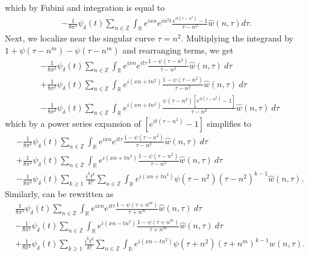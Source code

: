 \documentclass[12pt,reqno]{amsart}
\numberwithin{equation}{section}  %
\renewcommand{\cref}{\Cref}
\newcommand{\rr}{\mathbb{R}}
\newcommand{\zz}{\mathbb{Z}}
\newcommand{\wh}{\widehat}
\begin{document}
%
%
which by Fubini and integration is equal to
%
%
\begin{equation*}
\begin{split}
  -\frac{1}{8 \pi^{2}}  \psi_{\delta}(t) \sum_{n \in \zz} \int_{\rr} e^{ixn}
  e^{in^{2}t} \frac{e^{it(\tau - n^{2})} -1}{\tau - n^{2}}\wh{w}(n, \tau) d \tau.
\end{split}
\end{equation*}
%
Next, we localize near the singular curve $\tau =  n^2$.  Multiplying the
integrand by $1 + \psi(\tau -
n^m) - \psi(\tau -
n^m) $ and
rearranging terms, we get
%
%
\begin{equation*}
	\begin{split}
	& - \frac{1}{8 \pi^2}  \psi_{\delta}(t) \sum_{n \in \zz} \int_\rr e^{ixn}  
		e^{it \tau} \frac{1 - \psi(\tau - n^{2}) 
}{\tau - n^{2}} \wh{w}(n, \tau) \ d \tau
		\\
		& + \frac{1}{8 \pi^2}  \psi_{\delta}(t) \sum_{n \in \zz} \int _\rr e^{i(xn + 
		t n^{2})}
		 \frac{1- \psi(\tau - n^{2})}{\tau - n^{2}} \wh{w}(n, \tau) \ d \tau
		\\
		& - \frac{1}{8 \pi^2}  \psi_{\delta}(t) \sum_{n \in \zz} \int_\rr
		e^{i(xn + t n^{2})}
		\frac{\psi(\tau - n^{2})\left[ e^{it(\tau - n^{2})}-1 
		\right]}{\tau - n^{2}} \wh{w}(n, \tau) \ d \tau
	\end{split}
\end{equation*}
%
%
which by a power series expansion of $[e^{it(\tau - n^{2})}-1]$ simplifies  
to
%
%
\begin{align}
		\label{main-int-expression'-2}
		& -\frac{1}{8 \pi^2}  \psi_{\delta}(t) \sum_{n\in \zz} \int_\rr e^{ixn}  
		e^{it \tau} \frac{1 - \psi(\tau -  n^{2}) 
}{\tau -  n^{2}} \wh{w}(n, \tau) \ d \tau
		\\
		\label{main-int-expression'-3}
		& + \frac{1}{8 \pi^2}  \psi_{\delta}(t) \sum_{n\in \zz} \int_\rr e^{i(xn + 
		t n^{2})}
		 \frac{1- \psi(\tau -  n^{2})}{\tau -  n^{2}} \wh{w}(n, \tau) \ d \tau
		\\
		\label{main-int-expression'-4}
		& - \frac{1}{8 \pi^2}  \psi_{\delta}(t) \sum_{k \ge 1} \frac{i^k t^k}{k!}
		\sum_{n \in \zz} \int_\rr e^{i(xn + t n^{2} )}
		\psi(\tau -  n^{2}) (\tau -  n^{2})^{k-1} \wh{w}(n, \tau).
\end{align}
%
Similarly, \cref{term-4} can be rewritten as
%
\begin{align}
		\label{main-int-expression''-2}
		& \frac{1}{8 \pi^2}  \psi_{\delta}(t) \sum_{n\in \zz} \int_\rr e^{ixn}  
		e^{it \tau} \frac{1 - \psi(\tau +  n^m) 
}{\tau +  n^m} \wh{w}(n, \tau) \ d \tau
		\\
		\label{main-int-expression''-3}
		&  - \frac{1}{8 \pi^2}  \psi_{\delta}(t) \sum_{n\in \zz} \int_\rr e^{i(xn - 
		t n^2)}
		 \frac{1- \psi(\tau +  n^m)}{\tau +  n^m} \wh{w}(n, \tau) \ d \tau
		\\
		\label{main-int-expression''-4}
		& + \frac{1}{8 \pi^2}  \psi_{\delta}(t) \sum_{k \ge 1} \frac{i^k t^k}{k!}
		\sum_{n \in \zz} \int_\rr e^{i(xn - t n^2 )}
		\psi(\tau +  n^2) (\tau +  n^m)^{k-1} \wh{w}(n, \tau).
\end{align}
\end{document}
